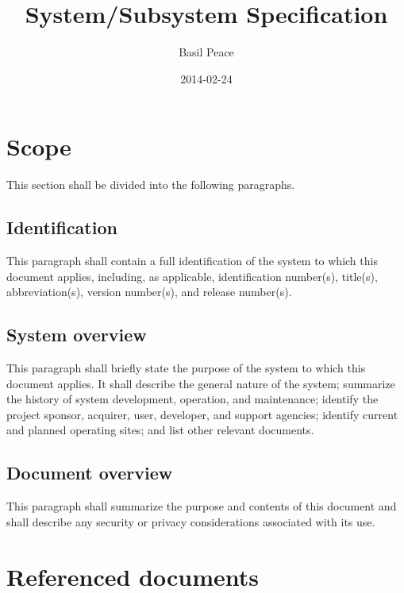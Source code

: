 \documentclass{fidata-report-template}
\begin{document}
\frontmatter

\title{System/Subsystem Specification}

\date{2014-02-24}

\author{Basil Peace}

\maketitle
\tableofcontents

\section{Scope}

This section shall be divided into the following paragraphs.

\subsection{Identification}

This paragraph shall contain a full identification of the system to
which this document applies, including, as applicable, identification
number(s), title(s), abbreviation(s), version number(s), and release
number(s).

\subsection{System overview}

This paragraph shall briefly state the purpose of the system to which
this document applies. It shall describe the general nature of the
system; summarize the history of system development, operation, and
maintenance; identify the project sponsor, acquirer, user, developer,
and support agencies; identify current and planned operating sites; and
list other relevant documents.

\subsection{Document overview}

This paragraph shall summarize the purpose and contents of this document
and shall describe any security or privacy considerations associated
with its use.

\section{Referenced documents}
\end{document}
